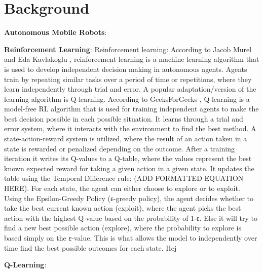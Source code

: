 \section{Background}

\textbf{Autonomous Mobile Robots}:


\textbf{Reinforcement Learning}:
Reinforcement learning: According to Jacob Murel and Eda Kavlakoglu \cite{JacobMurel1RL}, reinforcement learning is a machine learning
algorithm that is used to develop independent decision making in autonomous agents.
Agents train by repeating similar tasks over a period of time or repetitions, where they
learn independently through trial and error. A popular adaptation/version of the learning
algorithm is Q-learning. According to GeeksForGeeks \cite{GeeksForGeeks1RL}, Q-learning is a model-free RL
algorithm that is used for training independent agents to make the best decision
possible in each possible situation. It learns through a trial and error system, where it
interacts with the environment to find the best method. A state-action-reward system is
utilized, where the result of an action taken in a state is rewarded or penalized
depending on the outcome. After a training iteration it writes its Q-values to a Q-table,
where the values represent the best known expected reward for taking a given action in
a given state. It updates the table using the Temporal Difference rule:
(ADD FORMATTED EQUATION HERE). For each state, the agent can either choose to
explore or to exploit. Using the Epsilon-Greedy Policy (ε-greedy policy), the agent
decides whether to take the best current known action (exploit), where the agent picks
the best action with the highest Q-value based on the probability of 1-ε. Else it will try to
find a new best possible action (explore), where the probability to explore is based
simply on the ε-value. This is what allows the model to independently over time find the
best possible outcomes for each state. Hej


\textbf{Q-Learning}: